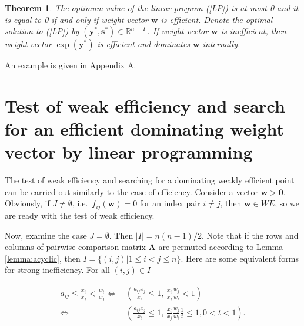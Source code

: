 \documentclass{article}
\theoremstyle{plain}
\newtheorem{theorem}{Theorem}[section]
\begin{document}
\begin{theorem} \label{thm:LP}
The optimum value of the linear program (\ref{LP}) is at most 0
and it is equal to 0 if and only if weight vector $\mathbf{w}$ is ef{\kern0pt}f{\kern0pt}icient.
Denote the optimal solution to (\ref{LP}) by $(\mathbf{y}^{\ast},\mathbf{s}^{\ast}) \in \mathbb{R}^{n+|I|}.$
If weight vector $\mathbf{w}$ is inef{\kern0pt}f{\kern0pt}icient, then
weight vector $\exp({\mathbf{y}}^{\ast})$ is ef{\kern0pt}f{\kern0pt}icient and dominates $\mathbf{w}$ internally.
\end{theorem}

An example is given in Appendix A.

\section{Test of weak ef{\kern0pt}f{\kern0pt}iciency and search for an ef{\kern0pt}f{\kern0pt}icient dominating weight vector by linear programming}
\label{section:5} %

The test of weak ef{\kern0pt}f{\kern0pt}iciency and searching for a dominating weakly ef{\kern0pt}f{\kern0pt}icient point can be carried out similarly to the case of ef{\kern0pt}f{\kern0pt}iciency. Consider a vector $\mathbf{w}>\mathbf{0}$. Obviously, if $J\ne\emptyset$, i.e.\ $f_{ij}(\mathbf{w})=0$ for an index pair $i\ne j$, then $\mathbf{w}\in W\!E$, so we are ready with the test of weak ef{\kern0pt}f{\kern0pt}iciency.

Now, examine the case $J=\emptyset$. Then $|I| = n(n-1)/2$.
Note that if the rows and columns of pairwise comparison matrix $\mathbf{A}$
are permuted according to Lemma \ref{lemma:acyclic}, then $I = \{(i,j) | 1 \leq i < j \leq n  \}.$
Here are some equivalent forms for strong inef{\kern0pt}f{\kern0pt}iciency. For all $(i,j) \in I$

\begin{align}
a_{ij} \leq \frac{x_i}{x_j} < \frac{w_i}{w_j}   \Longleftrightarrow &  \,
\left( \frac{a_{ij}x_j}{x_i}  \leq 1, \,
\frac{x_i}{x_j} \frac{w_j}{w_i} < 1 \right)\ \nonumber
\\
\Longleftrightarrow & \, \left( \frac{a_{ij}x_j}{x_i}  \leq 1, \, \frac{x_i}{x_j} \frac{w_j}{w_i} \frac{1}{t} \leq 1,
0 < t < 1 \right) . %
\label{eq:WEforms} %
\end{align}
\end{document}
